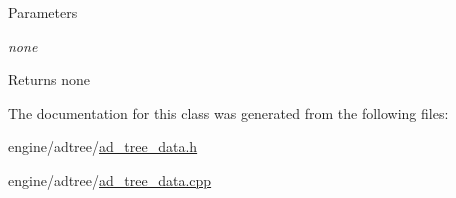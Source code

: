 \begin{DoxyParams}{Parameters}
\item[{\em none}]\end{DoxyParams}
\begin{DoxyReturn}{Returns}
none 
\end{DoxyReturn}


The documentation for this class was generated from the following files:\begin{DoxyCompactItemize}
\item 
engine/adtree/\hyperlink{ad__tree__data_8h}{ad\_\-tree\_\-data.h}\item 
engine/adtree/\hyperlink{ad__tree__data_8cpp}{ad\_\-tree\_\-data.cpp}\end{DoxyCompactItemize}
